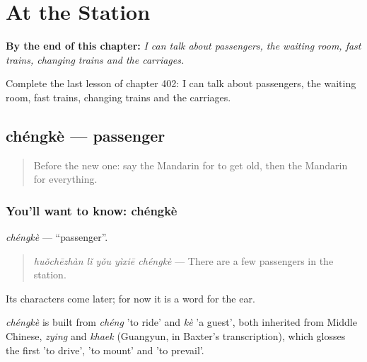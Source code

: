 
\chapter{At the Station}
\label{ch:zh-at-the-station}

\begin{chapteropening}
\textbf{By the end of this chapter:} \emph{I can talk about passengers, the waiting room, fast trains, changing trains and the carriages.}

Complete the last lesson of chapter 402: I can talk about passengers, the waiting room, fast trains, changing trains and the carriages.
\end{chapteropening}

\section[chéngkè]{chéngkè — passenger}

\label{lesson:ZH-C402-chengke}



\begin{quote}
Before the new one: say the Mandarin for to get old, then the Mandarin for everything.
\end{quote}

\subsection*{You'll want to know: chéngkè}
\emph{chéngkè} — \textquotedblleft{}passenger\textquotedblright{}.

\begin{quote}
\emph{huǒchēzhàn lǐ yǒu yìxiē chéngkè} — There are a few passengers in the station.
\end{quote}

Its characters come later; for now it is a word for the ear.

\begin{cousinweb}
\emph{chéngkè} is built from \emph{chéng} 'to ride' and \emph{kè} 'a guest', both inherited from Middle Chinese, \emph{zying} and \emph{khaek} (Guangyun, in Baxter's transcription), which glosses the first 'to drive', 'to mount' and 'to prevail'.
\end{cousinweb}

